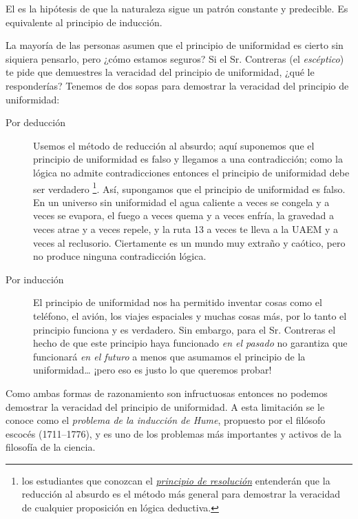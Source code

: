 \begin{remember}
    \label{rem:principio de uniformidad}
    El  es la hipótesis de que la
    naturaleza sigue un patrón constante y predecible.
    Es equivalente al principio de inducción.
\end{remember}

La mayoría de las personas asumen que el principio de uniformidad es cierto
sin siquiera pensarlo, pero ¿cómo estamos seguros?
Si el Sr. Contreras (el \emph{escéptico}) te pide que demuestres la veracidad
del principio de uniformidad, ¿qué le responderías?
Tenemos de dos sopas para demostrar la veracidad del principio de uniformidad:
\begin{description}
    \item[Por deducción] Usemos el método de reducción al absurdo; aquí
          suponemos que el principio de uniformidad es falso y llegamos a una
          contradicción; como la lógica no admite contradicciones entonces el
          principio de uniformidad debe ser verdadero%
          \footnote{%
              los estudiantes que conozcan el
              \href{http://intrologic.stanford.edu/extras/resolution.html}%
              {\emph{principio de resolución}} entenderán que la reducción al
              absurdo es el método más general para demostrar la veracidad de
              cualquier proposición en lógica deductiva.
          }.
          Así, supongamos que el principio de uniformidad es falso.
          En un universo sin uniformidad el agua caliente a veces se congela y a
          veces se evapora, el fuego a veces quema y a veces enfría, la gravedad
          a veces atrae y a veces repele, y la ruta 13 a veces te lleva a la UAEM
          y a veces al reclusorio.
          Ciertamente es un mundo muy extraño y caótico, pero no produce ninguna
          contradicción lógica.
    \item[Por inducción] El principio de uniformidad nos ha permitido inventar
          cosas como el teléfono, el avión, los viajes espaciales y muchas cosas
          más, por lo tanto el principio funciona y es verdadero.
          Sin embargo, para el Sr. Contreras el hecho de que este principio haya
          funcionado \emph{en el pasado} no garantiza que funcionará \emph{en el
              futuro} a menos que asumamos el principio de la uniformidad… ¡pero
          eso es justo lo que queremos probar!
\end{description}
Como ambas formas de razonamiento son infructuosas entonces no podemos demostrar
la veracidad del principio de uniformidad.
A esta limitación se le conoce como el \emph{problema de la inducción de Hume},
propuesto por el filósofo escocés  (1711--1776),
y es uno de los problemas más importantes y activos de la filosofía de la
ciencia.

